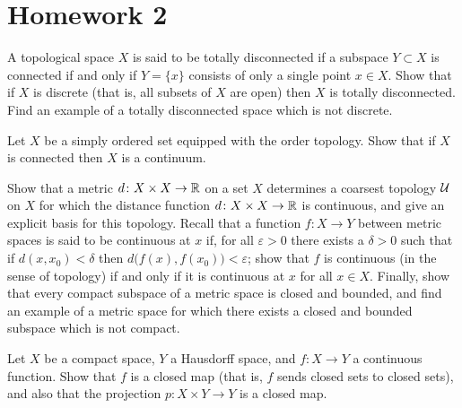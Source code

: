 \section{Homework 2}
\begin{exercise}
  A topological space \(X\) is said to be totally disconnected if a
  subspace \(Y\subset X\) is connected if and only if \(Y=\{x\}\)
  consists of only a single point \(x\in X\). Show that if \(X\) is
  discrete (that is, all subsets of \(X\) are open) then \(X\) is totally
  disconnected. Find an example of a totally disconnected space which is
  not discrete.
\end{exercise}
\begin{solution}
\end{solution}

\begin{exercise}
  Let \(X\) be a simply ordered set equipped with the order topology. Show
  that if \(X\) is connected then \(X\) is a continuum.
\end{exercise}
\begin{solution}
\end{solution}

\begin{exercise}
  Show that a metric \(d\colon X\times X\to\mathbb{R}\) on a set \(X\) determines
  a coarsest topology \(\mathcal{U}\) on \(X\) for which the distance function
  \(d\colon X\times X\to\mathbb{R}\) is continuous, and give an explicit basis
  for this topology. Recall that a function \(f\colon X\to Y\) between
  metric spaces is said to be continuous at \(x\) if, for all
  \(\varepsilon>0\) there exists a \(\delta>0\) such that if
  \(d(x,x_0)<\delta\) then \(d\bigl(f(x),f(x_0)\bigr)<\varepsilon\); show
  that \(f\) is continuous (in the sense of topology) if and only if it is
  continuous at \(x\) for all \(x\in X\). Finally, show that every compact
  subspace of a metric space is closed and bounded, and find an example of
  a metric space for which there exists a closed and bounded subspace which
  is not compact.
\end{exercise}
\begin{solution}
\end{solution}

\begin{exercise}
  Let \(X\) be a compact space, \(Y\) a Hausdorff space, and
  \(f\colon X\to Y\) a continuous function. Show that \(f\) is a closed map
  (that is, \(f\) sends closed sets to closed sets), and also that the
  projection \(p\colon X\times Y\to Y\) is a closed map.
\end{exercise}
\begin{solution}
\end{solution}


